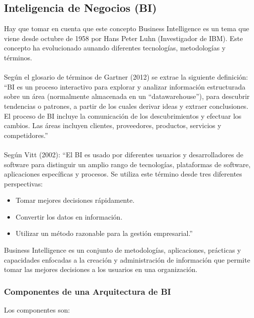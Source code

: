 \documentclass[preprint,12pt]{elsarticle}
\begin{document}
	\subsection{\textbf{Inteligencia de Negocios (BI)}}
	Hay que tomar en cuenta que este concepto Business Intelligence es un tema que viene desde octubre de 1958 
por Hans Peter Luhn (Investigador de IBM). Este concepto ha evolucionado aunando diferentes tecnologías, metodologías
 y términos.\cite{referenciarobles1}
\\
\\
Según el glosario de términos de Gartner (2012) se extrae la siguiente definición:
“BI es un proceso interactivo para explorar y analizar información estructurada sobre un área (normalmente almacenada en un “datawarehouse”), para descubrir tendencias o patrones, a partir de los cuales derivar ideas y extraer conclusiones. El proceso de BI incluye la comunicación de los descubrimientos y efectuar los cambios. Las áreas incluyen clientes, proveedores, productos, servicios y competidores.” \cite{referenciarobles1}
\\
\\
Según Vitt (2002):
“El BI es usado por diferentes usuarios y desarrolladores de software para distinguir un amplio rango de tecnologías, plataformas de software, aplicaciones específicas y procesos. Se utiliza este término desde tres diferentes perspectivas:
	\begin{itemize}
	\item Tomar mejores decisiones rápidamente.
	\item Convertir los datos en información.
	\item Utilizar un método razonable para la gestión empresarial.”  \cite{referenciarobles1} \\
	\end{itemize}

Business Intelligence  es un conjunto de metodologías, aplicaciones, prácticas y capacidades enfocadas a la creación
 y administración de información que permite tomar las mejores decisiones a los usuarios en una organización.

	\subsubsection{\textbf{Componentes de una Arquitectura de BI}}

	Los componentes son:
\end{document}

